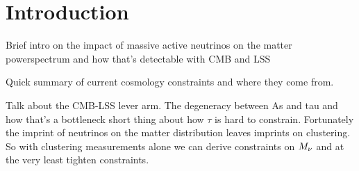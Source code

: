 \section{Introduction}
Brief intro on the impact of massive active neutrinos on the matter powerspectrum 
and how that's detectable with CMB and LSS

Quick summary of current cosmology constraints and where they come from. 




Talk about 
the CMB-LSS lever arm. The degeneracy between As and tau and how that's a bottleneck
short thing about how $\tau$ is hard to constrain.
Fortunately the imprint of neutrinos on the matter distribution leaves imprints
on clustering. So with clustering measurements alone we can derive constraints 
on $M_\nu$ and at the very least tighten constraints.  


